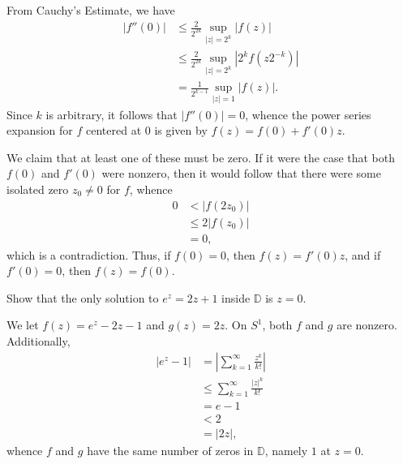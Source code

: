 \documentclass[10pt]{mypackage}
\renewcommand{\D}{\mathbb{D}}
\begin{document}
\begin{solution}
  From Cauchy's Estimate, we have
  \begin{align*}
    \left\vert f''(0) \right\vert &\leq \frac{2}{2^{2k}}\sup_{|z| = 2^{k}} \left\vert f(z) \right\vert\\
                                  &\leq \frac{2}{2^{2k}}\sup_{|z| = 2^{k}} \left\vert 2^{k}f\left( z2^{-k} \right) \right\vert\\
                                  &= \frac{1}{2^{k-1}} \sup_{|z| = 1}\left\vert f(z) \right\vert.
  \end{align*}
  Since $k$ is arbitrary, it follows that $\left\vert f''(0) \right\vert = 0$, whence the power series expansion for $f$ centered at $0$ is given by $f(z) = f(0) + f'(0)z$.%

  We claim that at least one of these must be zero. If it were the case that both $f(0)$ and $f'(0)$ were nonzero, then it would follow that there were some isolated zero $z_0\neq 0$ for $f$, whence
  \begin{align*}
    0 &< \left\vert f\left( 2z_0 \right) \right\vert\\
      &\leq 2\left\vert f\left( z_0 \right) \right\vert\\
      &= 0,
  \end{align*}
  which is a contradiction. Thus, if $f(0) = 0$, then $f(z) = f'(0)z$, and if $f'(0) = 0$, then $f(z) = f(0)$.
\end{solution}
\begin{problem}[Problem 3]
  Show that the only solution to $e^{z} = 2z+1$ inside $\D$ is $z = 0$.
\end{problem}
\begin{solution}
  We let $f(z) = e^{z}-2z-1$ and $g(z) = 2z$. On $S^{1}$, both $f$ and $g$ are nonzero. Additionally,
  \begin{align*}
    \left\vert e^{z}-1 \right\vert &= \left\vert \sum_{k=1}^{\infty}\frac{z^{k}}{k!} \right\vert\\
                                   &\leq \sum_{k=1}^{\infty} \frac{\left\vert z \right\vert^{k}}{k!}\\
                                   &= e-1\\
                                   &< 2\\
                                   &= \left\vert 2z \right\vert,
  \end{align*}
  whence $f$ and $g$ have the same number of zeros in $\D$, namely $1$ at $z = 0$.
\end{solution}
\end{document}
